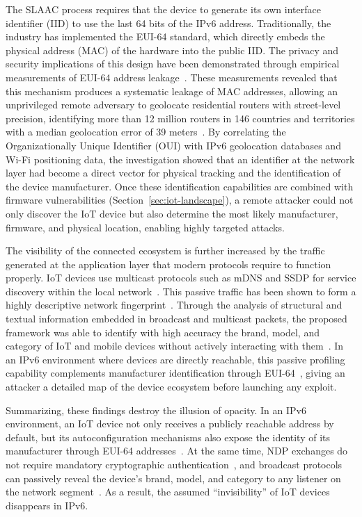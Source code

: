 The SLAAC process requires that the device to generate its own interface identifier (IID) to use the last 64 bits of the IPv6 address. Traditionally, the industry has implemented the EUI-64 standard, which directly embeds the physical address (MAC) of the hardware into the public IID. The privacy and security implications of this design have been demonstrated through empirical measurements of EUI-64 address leakage~\cite{rye2023ipvseeyou}. These measurements revealed that this mechanism produces a systematic leakage of MAC addresses, allowing an unprivileged remote adversary to geolocate residential routers with street-level precision, identifying more than 12 million routers in 146 countries and territories with a median geolocation error of 39 meters~\cite{rye2023ipvseeyou}. By correlating the Organizationally Unique Identifier (OUI) with IPv6 geolocation databases and Wi-Fi positioning data, the investigation showed that an identifier at the network layer had become a direct vector for physical tracking and the identification of the device manufacturer. Once these identification capabilities are combined with firmware vulnerabilities (Section~\ref{sec:iot-landscape}), a remote attacker could not only discover the IoT device but also determine the most likely manufacturer, firmware, and physical location, enabling highly targeted attacks.

The visibility of the connected ecosystem is further increased by the traffic generated at the application layer that modern protocols require to function properly. IoT devices use multicast protocols such as mDNS and SSDP for service discovery within the local network~\cite{yu2020broadcast}. This passive traffic has been shown to form a highly descriptive network fingerprint~\cite{yu2020broadcast}. Through the analysis of structural and textual information embedded in broadcast and multicast packets, the proposed framework was able to identify with high accuracy the brand, model, and category of IoT and mobile devices without actively interacting with them~\cite{yu2020broadcast}. In an IPv6 environment where devices are directly reachable, this passive profiling capability complements manufacturer identification through EUI-64~\cite{rye2023ipvseeyou}, giving an attacker a detailed map of the device ecosystem before launching any exploit.

Summarizing, these findings destroy the illusion of opacity. In an IPv6 environment, an IoT device not only receives a publicly reachable address by default, but its autoconfiguration mechanisms also expose the identity of its manufacturer through EUI-64 addresses~\cite{rye2023ipvseeyou}. At the same time, NDP exchanges do not require mandatory cryptographic authentication~\cite{rfc3756}, and broadcast protocols can passively reveal the device’s brand, model, and category to any listener on the network segment~\cite{yu2020broadcast}. As a result, the assumed ``invisibility'' of IoT devices disappears in IPv6.
